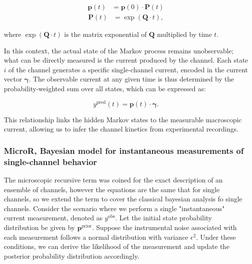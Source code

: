 \documentclass[pdflatex,sn-mathphys-num]{sn-jnl}%
\theoremstyle{thmstyleone}%
\theoremstyle{thmstyletwo}%
\theoremstyle{thmstylethree}%
\begin{document}
\begin{align}
	\boldsymbol{p}(t) &= \boldsymbol{p}(0) \cdot \boldsymbol{P}(t)
	\label{eq:master_equation_solution}
\end{align}
\begin{align}
	\boldsymbol{P} (t) &= \exp(\boldsymbol{Q} \cdot t),
	\label{eq:Transition_Matrix_definition}
\end{align}


where \( \exp(\boldsymbol{Q} \cdot t) \) is the matrix exponential of \( \boldsymbol{Q} \) multiplied by time \( t \). 

In this context, the actual state of the Markov process remains unobservable; what can be directly measured is the current produced by the channel. Each state \( i \) of the channel generates a specific single-channel current, encoded in the current vector \( \boldsymbol{\gamma} \). The observable current at any given time is thus determined by the probability-weighted sum over all states, which can be expressed as:

\begin{equation}
	y^{\text{pred}}(t) = \boldsymbol{p}(t) \cdot \boldsymbol{\gamma}.
	\label{eq:single_channel_prediction}
\end{equation}

This relationship links the hidden Markov states to the measurable macroscopic current, allowing us to infer the channel kinetics from experimental recordings.



\subsubsection{MicroR, Bayesian model for instantaneous measurements of single-channel behavior}

The microscopic recursive term was coined for the exact description of an ensemble of channels, however the equations are the same that for single channels, so we extend the term to cover the classical bayesian analysis fo single channels. 
Consider the scenario where we perform a single "instantaneous" current measurement, denoted as \( y^{\text{obs}} \). Let the initial state probability distribution be given by \( \boldsymbol{p}^{\text{prior}} \). Suppose the instrumental noise associated with each measurement follows a normal distribution with variance \( \epsilon^2 \). Under these conditions, we can derive the likelihood of the measurement and update the posterior probability distribution accordingly.
\end{document}
